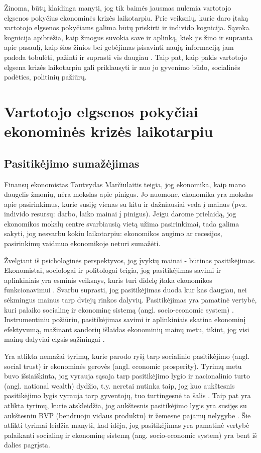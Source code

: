 \documentclass[l1pt, titlepage]{article}
\begin{document}
 Žinoma, būtų klaidinga manyti, jog tik baimės jausmas nulemia vartotojo elgsenos pokyčius ekonominės krizės laikotarpiu. Prie veiksnių, kurie daro įtaką vartotojo elgsenos pokyčiams galima būtų priskirti ir individo kognicija. Sąvoka kognicija apibrėžia, kaip žmogus suvokia save ir aplinką, kiek jis žino ir supranta apie pasaulį, kaip šios žinios bei gebėjimas įsisavinti naują informaciją jam padeda tobulėti, pažinti ir suprasti vis daugiau \cite{hanushek2008role}. Taip pat, kaip pakis vartotojo elgsena krizės laikotarpiu gali priklausyti ir nuo jo gyvenimo būdo, socialinės padėties, politinių pažiūrų. 


\section{Vartotojo elgsenos pokyčiai ekonominės krizės laikotarpiu}
\subsection{Pasitikėjimo sumažėjimas}
Finansų ekonomistas Tautvydas Marčiulaitis teigia, jog ekonomika, kaip mano daugelis žmonių, nėra mokslas apie pinigus. Jo nuomone, ekonomika yra mokslas apie pasirinkimus, kurie susiję vienas su kitu ir dažniausiai veda į mainus (pvz. individo resursų: darbo, laiko mainai į pinigus). Jeigu darome prielaidą, jog ekonomikos mokslų centre svarbiausią vietą užima pasirinkimai, tada galima sakyti, jog nesvarbu kokiu laikotarpiu: ekonomikos augimo ar recesijos, pasirinkimų vaidmuo ekonomikoje neturi sumažėti. 

Žvelgiant iš psichologinės perspektyvos, jog įvyktų mainai - būtinas pasitikėjimas. Ekonomistai, sociologai ir politologai teigia, jog pasitikėjimas savimi ir aplinkiniais yra esminis veiksnys, kuris turi didelę įtaka ekonomikos funkcionavimui \cite{tonkiss2009trust}. Svarbu suprasti, jog pasitikėjimas duoda kur kas daugiau, nei sėkmingus mainus tarp dviejų rinkos dalyvių. Pasitikėjimas yra pamatinė vertybė, kuri palaiko socialinę ir ekonominę sistemą (angl. socio-economic system) \cite{tonkiss2009trust}. Instrumentiniu požiūriu, pasitikėjimas savimi ir aplinkiniais skatina ekonominį efektyvumą, mažinant sandorių išlaidas ekonominių mainų metu, tikint, jog visi mainų dalyviai elgsis sąžiningai \cite{tonkiss2009trust}. 

Yra atlikta nemažai tyrimų, kurie parodo ryšį tarp socialinio pasitikėjimo (angl. social trust) ir ekonominės gerovės (angl. economic prosperity). Tyrimų metu buvo išsiaiškinta, jog vyrauja sąsaja tarp pasitikėjimo lygio ir nacionalinio turto (angl. national wealth) dydžio, t.y. neretai nutinka taip, jog kuo aukštesnis pasitikėjimo lygis vyrauja tarp gyventojų, tuo turtingesnė ta šalis \cite{beugelsdijk2004trust}. Taip pat yra atlikta tyrimų, kurie atskleidžia, jog aukštesnis pasitikėjimo lygis yra susijęs su aukštesniu BVP (bendruoju vidaus produktu) ir žemesne pajamų nelygybe \cite{rothstein2004all}. Šie atlikti tyrimai leidžia manyti, kad idėja, jog pasitikėjimas yra pamatinė vertybė palaikanti socialinę ir ekonominę sistemą (ang. socio-economic system) yra bent iš dalies pagrįsta. 
\end{document}
